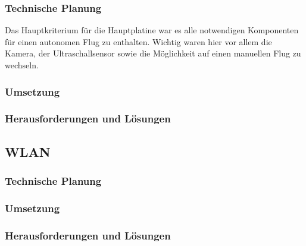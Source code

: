     \subsubsection{Technische Planung}
    Das Hauptkriterium für die Hauptplatine war es alle notwendigen Komponenten für einen autonomen Flug zu enthalten. Wichtig waren hier vor allem die Kamera,
    der Ultraschallsensor sowie die Möglichkeit auf einen manuellen Flug zu wechseln.

    \subsubsection{Umsetzung}


    \subsubsection{Herausforderungen und Lösungen}

  \subsection{WLAN}

    \subsubsection{Technische Planung}

    \subsubsection{Umsetzung}

    \subsubsection{Herausforderungen und Lösungen}

